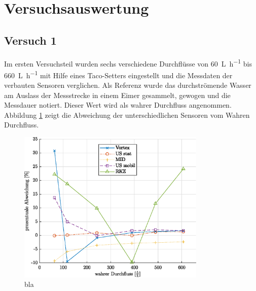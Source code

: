 \section{Versuchsauswertung}

\subsection{Versuch 1}
Im ersten Versuchsteil wurden sechs verschiedene Durchflüsse von \SI{60}{\liter\per\hour} bis \SI{660}{\liter\per\hour} mit Hilfe eines Taco-Setters eingestellt und die Messdaten der verbauten Sensoren verglichen. Als Referenz wurde das durchströmende Wasser am Auslass der Messstrecke in einem Eimer gesammelt, gewogen und die Messdauer notiert. Dieser Wert wird als wahrer Durchfluss angenommen. Abbildung \ref{fig:devPc} zeigt die Abweichung der unterschiedlichen Sensoren vom Wahren Durchfluss. 
\begin{figure}[H]
	\centering
	\includegraphics[width=0.8\textwidth]{../DATA/devPcPlot.eps}
	\caption[bla]{bla}
	\label{fig:devPc}
\end{figure}


